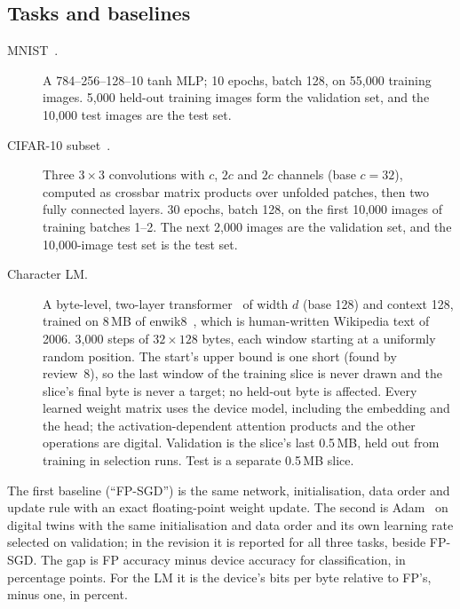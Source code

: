 \subsection{Tasks and baselines}\label{sec:tasks}
\begin{description}
\item[MNIST~\cite{lecun1998}.] A 784--256--128--10 tanh MLP; 10 epochs, batch 128, on 55{,}000 training images. 5{,}000 held-out
      training images form the validation set, and the 10{,}000 test images are the test set.
\item[CIFAR-10 subset~\cite{krizhevsky2009}.] Three $3\times3$ convolutions with $c$, $2c$ and $2c$ channels (base $c=32$),
      computed as crossbar matrix products over unfolded patches, then two fully connected layers. 30 epochs, batch 128, on the
      first 10{,}000 images of training batches 1--2. The next 2{,}000 images are the validation set, and the 10{,}000-image
      test set is the test set.
\item[Character LM.] A byte-level, two-layer transformer~\cite{vaswani2017} of width $d$ (base 128) and context 128, trained on
      8\,MB of enwik8~\cite{mahoney2011}, which is human-written Wikipedia text of 2006. 3{,}000 steps of $32\times128$ bytes, each window starting at a uniformly random position. The start's upper bound is
      one short (found by review~8), so the last window of the training slice is never drawn and the slice's final byte is
      never a target; no held-out byte is affected.
      Every learned weight matrix uses the device model, including the embedding and the head; the activation-dependent
      attention products and the other operations are digital. Validation is the slice's last 0.5\,MB, held out from
      training in selection runs. Test is a separate 0.5\,MB slice.
\end{description}
The first baseline (``FP-SGD'') is the same network, initialisation, data order and update rule with an exact floating-point
weight update. The second is Adam~\cite{kingma2014} on digital twins with the same initialisation and data order and its own
learning rate selected on validation; in the revision it is reported for all three tasks, beside FP-SGD. The gap is FP accuracy minus device
accuracy for classification, in percentage points. For the LM it is the device's bits per byte relative to FP's, minus one, in
percent.

